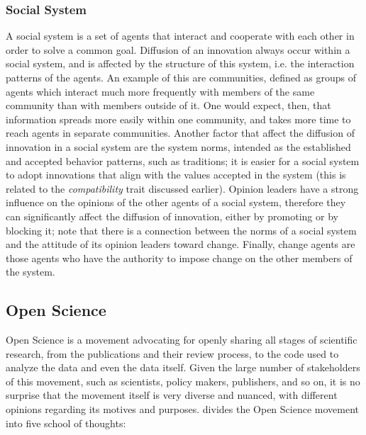 \documentclass[12pt]{article}
\begin{document}
\subsubsection{Social System}
\label{sec:org4a8f863}
A social system is a set of agents that interact and cooperate with each other in order to solve a common goal. Diffusion of an innovation always occur within a social system, and is affected by the structure of this system, i.e. the interaction patterns of the agents. An example of this are communities, defined as groups of agents which interact much more frequently with members of the same community than with members outside of it. One would expect, then, that information spreads more easily within one community, and takes more time to reach agents in separate communities. Another factor that affect the diffusion of innovation in a social system are the system norms, intended as the established and accepted behavior patterns, such as traditions; it is easier for a social system to adopt innovations that align with the values accepted in the system (this is related to the \emph{compatibility} trait discussed earlier). Opinion leaders have a strong influence on the opinions of the other agents of a social system, therefore they can significantly affect the diffusion of innovation, either by promoting or by blocking it; note that there is a connection between the norms of a social system and the attitude of its opinion leaders toward change. Finally, change agents are those agents who have the authority to impose change on the other members of the system.

\subsection{Open Science}
\label{sec:orgf7893ff}
Open Science is a movement advocating for openly sharing all stages of scientific research, from the publications and their review process, to the code used to analyze the data and even the data itself. Given the large number of stakeholders of this movement, such as scientists, policy makers, publishers, and so on, it is no surprise that the movement itself is very diverse and nuanced, with different opinions regarding its motives and purposes. \cite{fiveopenscience} divides the Open Science movement into five school of thoughts:
\end{document}
